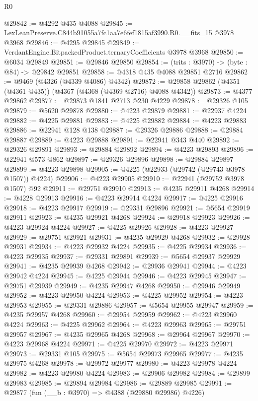 \begin{lexlean}{R0}
\begin{coremodule}
@29842 := @4292 @435 @4088
@29845 := LexLeanPreserve.C844b91055a7fc1aa7e6fef1815af3990.R0.__fits_15 @3978 @3968
@29846 := @4295 @29845
@29849 := VerdantEngine.BitpackedProduct.ternaryCoefficients @3978 @3968
@29850 := @6034 @29849
@29851 := @29846 @29850
@29854 := (trits : @3970) -> (byte : @84) -> @29842 @29851
@29858 := @4318 @435 @4088 @29851 @2716
@29862 := @9469 (@4326 (@4339 @4086) @4342)
@29872 := @29858 @29862 (@4351 (@4361 @435)) (@4367 (@4368 (@4369 @2716) @4088 @4342))
@29873 := @4377 @29862
@29877 := @29873 @1841 @2713 @230 @4229
@29878 := @29326 @105
@29879 := @5620 @29878
@29880 := @4223 @29879
@29881 := @22937 @4224
@29882 := @4225 @29881
@29883 := @4225 @29882
@29884 := @4223 @29883
@29886 := @22941 @128 @138
@29887 := @29326 @29886
@29888 := @29884 @29887
@29889 := @4223 @29888
@29891 := @22941 @343 @440
@29892 := @29326 @29891
@29893 := @29884 @29892
@29894 := @4223 @29893
@29896 := @22941 @573 @862
@29897 := @29326 @29896
@29898 := @29884 @29897
@29899 := @4223 @29898
@29905 := @4225 (@22933 (@29742 (@29743 @3978 @1507)) @4224)
@29906 := @4223 @29905
@29910 := @22941 (@29752 @3978 @1507) @92
@29911 := @29751 @29910
@29913 := @4235 @29911 @4268
@29914 := @4228 @29913
@29916 := @4223 @29914 @4224
@29917 := @4225 @29916
@29918 := @4223 @29917
@29919 := @29331 @29896
@29921 := @5654 @29919 @29911
@29923 := @4235 @29921 @4268
@29924 := @29918 @29923
@29926 := @4223 @29924 @4224
@29927 := @4225 @29926
@29928 := @4223 @29927
@29929 := @29751 @29921
@29931 := @4235 @29929 @4268
@29932 := @29928 @29931
@29934 := @4223 @29932 @4224
@29935 := @4225 @29934
@29936 := @4223 @29935
@29937 := @29331 @29891
@29939 := @5654 @29937 @29929
@29941 := @4235 @29939 @4268
@29942 := @29936 @29941
@29944 := @4223 @29942 @4224
@29945 := @4225 @29944
@29946 := @4223 @29945
@29947 := @29751 @29939
@29949 := @4235 @29947 @4268
@29950 := @29946 @29949
@29952 := @4223 @29950 @4224
@29953 := @4225 @29952
@29954 := @4223 @29953
@29955 := @29331 @29886
@29957 := @5654 @29955 @29947
@29959 := @4235 @29957 @4268
@29960 := @29954 @29959
@29962 := @4223 @29960 @4224
@29963 := @4225 @29962
@29964 := @4223 @29963
@29965 := @29751 @29957
@29967 := @4235 @29965 @4268
@29968 := @29964 @29967
@29970 := @4223 @29968 @4224
@29971 := @4225 @29970
@29972 := @4223 @29971
@29973 := @29331 @105
@29975 := @5654 @29973 @29965
@29977 := @4235 @29975 @4268
@29978 := @29972 @29977
@29980 := @4223 @29978 @4224
@29982 := @4223 @29980 @4224
@29983 := @29906 @29982
@29984 := @29899 @29983
@29985 := @29894 @29984
@29986 := @29889 @29985
@29991 := @29877 (fun (__b : @3970) => @4388 (@29880 @29986) @4226)

\end{coremodule}
\end{lexlean}
